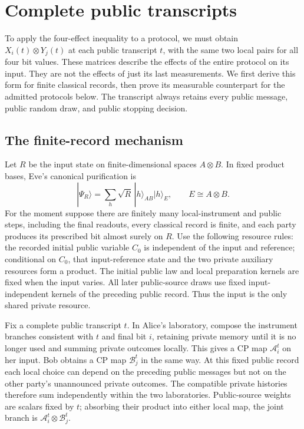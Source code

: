 \section{Complete public transcripts}
\label{sec:transcripts}

To apply the four-effect inequality to a protocol, we must obtain
$X_i(t)\otimes Y_j(t)$ at each public transcript $t$, with the same two
local pairs for all four bit values.  These matrices describe the effects
of the entire protocol on its input.  They are not the effects of just its
last measurements.  We first derive this form for finite classical records,
then prove its measurable counterpart for the admitted protocols below.
The transcript always retains every public message, public random draw,
and public stopping decision.

\subsection{The finite-record mechanism}

Let $R$ be the input state on finite-dimensional spaces $A\otimes B$.
In fixed product bases, Eve's canonical purification is
\begin{equation}\label{eq:canonical-purification}
 |\Psi_R\rangle=\sum_h\sqrt R\,|h\rangle_{AB}|h\rangle_E,
 \qquad E\cong A\otimes B.
\end{equation}
For the moment suppose there are finitely many local-instrument and public
steps, including the final readouts, every classical record is finite, and
each party produces its prescribed bit almost surely on $R$.  Use the
following resource rules: the recorded initial public variable
$C_0$ is independent of the input and reference; conditional on $C_0$, that
input-reference state and the two private auxiliary resources form a product.
The initial public law and local preparation kernels are fixed when the
input varies.  All later public-source draws use fixed input-independent
kernels of the preceding public record.  Thus the input is the only shared private resource.

Fix a complete public transcript $t$.  In Alice's laboratory, compose the
instrument branches consistent with $t$ and final bit $i$, retaining private
memory until it is no longer used and summing private outcomes locally.
This gives a CP map $\mathcal A_i^t$ on her input.  Bob obtains a CP map
$\mathcal B_j^t$ in the same way.  At this fixed public record each local
choice can depend on the preceding public messages but not on the other
party's unannounced private outcomes.  The compatible private histories
therefore sum independently within the two laboratories.  Public-source
weights are scalars fixed by $t$; absorbing their product into either local
map, the joint branch is $\mathcal A_i^t\otimes\mathcal B_j^t$.

